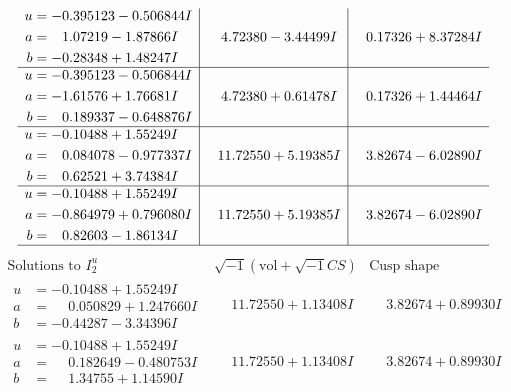 \documentclass[1p]{elsarticle_modified}
\theoremstyle{definition}
\newcommand{\I}{\sqrt{-1}}
\begin{document}
$$\begin{array}{c|c|c}
\begin{aligned}
u &= -0.395123 - 0.506844 I \\
a &= \phantom{-}1.07219 - 1.87866 I \\
b &= -0.28348 + 1.48247 I\end{aligned}
 & \phantom{-}4.72380 - 3.44499 I & \phantom{-}0.17326 + 8.37284 I \\ \hline\begin{aligned}
u &= -0.395123 - 0.506844 I \\
a &= -1.61576 + 1.76681 I \\
b &= \phantom{-}0.189337 - 0.648876 I\end{aligned}
 & \phantom{-}4.72380 + 0.61478 I & \phantom{-}0.17326 + 1.44464 I \\ \hline\begin{aligned}
u &= -0.10488 + 1.55249 I \\
a &= \phantom{-}0.084078 - 0.977337 I \\
b &= \phantom{-}0.62521 + 3.74384 I\end{aligned}
 & \phantom{-}11.72550 + 5.19385 I & \phantom{-}3.82674 - 6.02890 I \\ \hline\begin{aligned}
u &= -0.10488 + 1.55249 I \\
a &= -0.864979 + 0.796080 I \\
b &= \phantom{-}0.82603 - 1.86134 I\end{aligned}
 & \phantom{-}11.72550 + 5.19385 I & \phantom{-}3.82674 - 6.02890 I\\
 \hline 
 \end{array}$$\newpage$$\begin{array}{c|c|c}  
\text{Solutions to }I^u_{2}& \I (\text{vol} + \sqrt{-1}CS) & \text{Cusp shape}\\
 \hline 
\begin{aligned}
u &= -0.10488 + 1.55249 I \\
a &= \phantom{-}0.050829 + 1.247660 I \\
b &= -0.44287 - 3.34396 I\end{aligned}
 & \phantom{-}11.72550 + 1.13408 I & \phantom{-}3.82674 + 0.89930 I \\ \hline\begin{aligned}
u &= -0.10488 + 1.55249 I \\
a &= \phantom{-}0.182649 - 0.480753 I \\
b &= \phantom{-}1.34755 + 1.14590 I\end{aligned}
 & \phantom{-}11.72550 + 1.13408 I & \phantom{-}3.82674 + 0.89930 I \\ \hline\begin{aligned}

\end{aligned}
\end{array}$$
\end{document}
